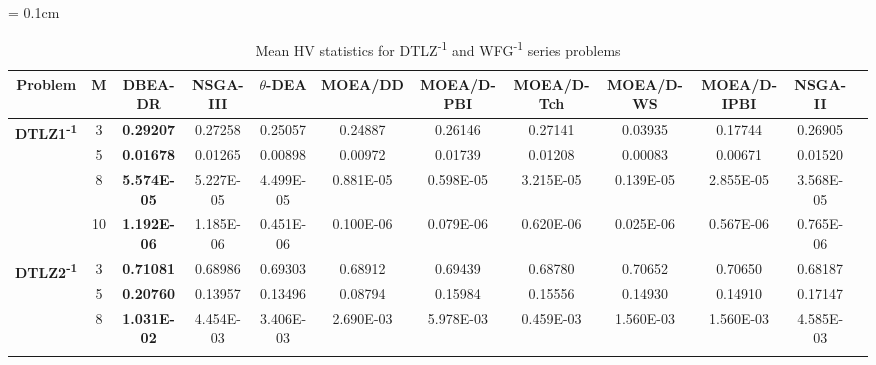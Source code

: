 \documentclass{sig-alternate}
\begin{document}
\begin{table*}[!htb]\scriptsize
	\centering
	\renewcommand{\arraystretch}{0.9}
	\caption{Mean HV statistics for DTLZ\textsuperscript{-1} and WFG\textsuperscript{-1} series problems}
	\label{tab:HVminus}
	\tabcolsep = 0.1cm
	\begin{tabular}{|c|c|c|c|c|c|c|c|c|c|c|c|}
		\noalign{\smallskip}\hline
		\textbf{Problem}                                      & \textbf{M} & \textbf{DBEA-DR}   & \textbf{NSGA-III}  & \textbf{$\theta$-DEA} & \textbf{MOEA/DD} & \textbf{MOEA/D-PBI} & \textbf{MOEA/D-Tch} & \textbf{MOEA/D-WS} & \textbf{MOEA/D-IPBI} & \textbf{NSGA-II}   \\ \hline
\multirow{4}{*}{\textbf{DTLZ1\textsuperscript{-1}}} & 3          & \textbf{0.29207}   & 0.27258            & 0.25057               & 0.24887          & 0.26146             & 0.27141             & 0.03935            & 0.17744              & 0.26905            \\ \cline{2-11} 
                                                      & 5          & \textbf{0.01678}   & 0.01265            & 0.00898               & 0.00972          & 0.01739             & 0.01208             & 0.00083            & 0.00671              & 0.01520            \\ \cline{2-11} 
                                                      & 8          & \textbf{5.574E-05} & 5.227E-05          & 4.499E-05             & 0.881E-05        & 0.598E-05           & 3.215E-05           & 0.139E-05          & 2.855E-05            & 3.568E-05          \\ \cline{2-11} 
                                                      & 10         & \textbf{1.192E-06} & 1.185E-06          & 0.451E-06             & 0.100E-06        & 0.079E-06           & 0.620E-06           & 0.025E-06          & 0.567E-06            & 0.765E-06          \\ \hline
\multirow{4}{*}{\textbf{DTLZ2\textsuperscript{-1}}} & 3          & \textbf{0.71081}   & 0.68986            & 0.69303               & 0.68912          & 0.69439             & 0.68780             & 0.70652            & 0.70650              & 0.68187            \\ \cline{2-11} 
                                                      & 5          & \textbf{0.20760}   & 0.13957            & 0.13496               & 0.08794          & 0.15984             & 0.15556             & 0.14930            & 0.14910              & 0.17147            \\ \cline{2-11} 
                                                      & 8          & \textbf{1.031E-02} & 4.454E-03          & 3.406E-03             & 2.690E-03        & 5.978E-03           & 0.459E-03           & 1.560E-03          & 1.560E-03            & 4.585E-03          \\ \cline{2-11} 

\end{tabular}
\end{table*}
\end{document}
